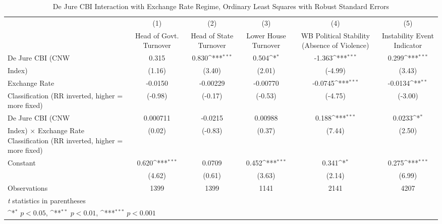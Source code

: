 \begin{table}[htbp]\centering
\def\sym#1{\ifmmode^{#1}\else\(^{#1}\)\fi}
\caption{De Jure CBI Interaction with Exchange Rate Regime, Ordinary Least Squares with Robust Standard Errors \label{imultIndOLSDJ}}
\begin{tabular}{l*{5}{c}}
\toprule
                &\multicolumn{1}{c}{(1)}&\multicolumn{1}{c}{(2)}&\multicolumn{1}{c}{(3)}&\multicolumn{1}{c}{(4)}&\multicolumn{1}{c}{(5)}\\
                &\multicolumn{1}{c}{Head of Govt. Turnover}&\multicolumn{1}{c}{Head of State Turnover}&\multicolumn{1}{c}{Lower House Turnover}&\multicolumn{1}{c}{WB Political Stability (Absence of Violence)}&\multicolumn{1}{c}{Instability Event Indicator}\\
\midrule
De Jure CBI (CNW&    0.315         &    0.830\sym{***}&    0.504\sym{*}  &   -1.363\sym{***}&    0.299\sym{***}\\
Index)          &   (1.16)         &   (3.40)         &   (2.01)         &  (-4.99)         &   (3.43)         \\
\addlinespace
Exchange Rate   &  -0.0150         & -0.00229         & -0.00770         &  -0.0745\sym{***}&  -0.0134\sym{**} \\
Classification (RR inverted, higher = more fixed)&  (-0.98)         &  (-0.17)         &  (-0.53)         &  (-4.75)         &  (-3.00)         \\
\addlinespace
De Jure CBI (CNW& 0.000711         &  -0.0215         &  0.00988         &    0.188\sym{***}&   0.0233\sym{*}  \\
Index) $\times$ Exchange Rate Classification (RR inverted, higher = more fixed)&   (0.02)         &  (-0.83)         &   (0.37)         &   (7.44)         &   (2.50)         \\
\addlinespace
Constant        &    0.620\sym{***}&   0.0709         &    0.452\sym{***}&    0.341\sym{*}  &    0.275\sym{***}\\
                &   (4.62)         &   (0.61)         &   (3.63)         &   (2.14)         &   (6.99)         \\
\midrule
Observations    &     1399         &     1399         &     1141         &     2141         &     4207         \\
\bottomrule
\multicolumn{6}{l}{\footnotesize \textit{t} statistics in parentheses}\\
\multicolumn{6}{l}{\footnotesize \sym{*} \(p<0.05\), \sym{**} \(p<0.01\), \sym{***} \(p<0.001\)}\\
\end{tabular}
\end{table}
